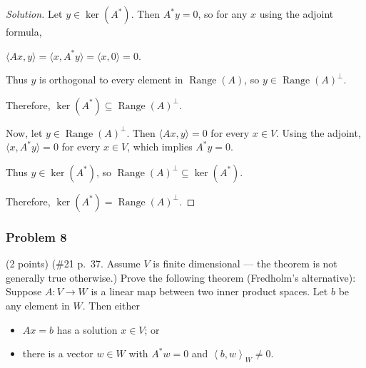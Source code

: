 \documentclass[11pt]{article}
\newcommand{\1}{\mathbf{1}}
\newcommand{\ip}[2]{\left\langle#1,#2\right\rangle}
\theoremstyle{definition}
\newenvironment{solution}{\begin{proof}[Solution]}{\end{proof}}
\begin{document}
\begin{solution}
Let $y\in\ker(A^*)$. Then $A^*y=0$, so for any $x$ using the adjoint formula,

$\langle Ax,y\rangle=\langle x,A^*y\rangle=\langle x,0\rangle=0$.

\par Thus $y$ is orthogonal to every element in $\operatorname{Range}(A)$, so $y\in\operatorname{Range}(A)^\perp$.

\par Therefore, $\ker(A^*)\subseteq\operatorname{Range}(A)^\perp$.

\par Now, let $y\in\operatorname{Range}(A)^\perp$. Then $\langle Ax,y\rangle=0$ for every $x\in V$. Using the adjoint, $\langle x,A^*y\rangle=0$ for every $x\in V$, which implies $A^*y=0$.

Thus $y\in\ker(A^*)$, so $\operatorname{Range}(A)^\perp\subseteq\ker(A^*)$.

\par Therefore, $\ker(A^*)=\operatorname{Range}(A)^\perp$.
\end{solution}

\subsubsection*{Problem 8}
(2 points) (\#21 p.~37. Assume $V$ is finite dimensional --- the theorem is not generally true otherwise.) Prove the following theorem (Fredholm's alternative): Suppose $A:V\to W$ is a linear map between two inner product spaces. Let $b$ be any element in $W$. Then either
\begin{itemize}
  \item $Ax=b$ has a solution $x\in V$; or
  \item there is a vector $w\in W$ with $A^*w=0$ and $\ip{b}{w}_W\ne0$.
\end{itemize}
\end{document}
